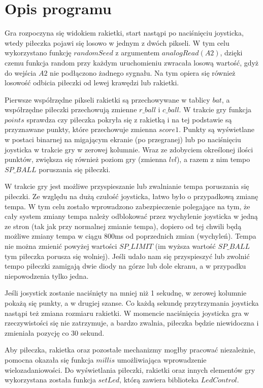\documentclass[12pt,notitlepage]{article}
\begin{document}
\section{Opis programu}

Gra rozpoczyna się widokiem rakietki, start nastąpi po naciśnięciu joysticka, wtedy piłeczka pojawi się losowo w jednym
z dwóch pikseli. W tym celu wykorzystano funkcję $randomSeed$ z argumentem $analogRead(A2)$, dzięki czemu funkcja random 
przy każdym uruchomieniu zwracała losową wartość, gdyż do wejścia $A2$ nie podłączono żadnego sygnału.
Na tym opiera się również losowość odbicia piłeczki od lewej krawędzi lub rakietki.

Pierwsze współrzędne pikseli rakietki są przechowywane w tablicy $bat$, a współrzędne piłeczki przechowują zmienne $r\_ball$ i $c\_ball$.
W trakcie gry funkcja $points$ sprawdza czy piłeczka pokryła się z rakietką i na tej podstawie są przyznawane punkty, które przechowuje zmienna $score1$.
Punkty są wyświetlane w postaci binarnej na migającym ekranie (po przegranej) lub po naciśnięciu joysticka w trakcie gry w zerowej kolumnie.
Wraz ze zdobyciem określonej ilości punktów, zwiększa się również poziom gry (zmienna $lvl$), a razem z nim tempo $SP\_BALL$ poruszania się piłeczki.

W trakcie gry jest możliwe przyspieszanie lub zwalnianie tempa poruszania się piłeczki. Ze względu na dużą czułość joysticka, łatwo było o
przypadkową zmianę tempa. W tym celu zostało wprowadzono zabezpieczenie polegające na tym, że cały system zmiany tempa należy odblokować
przez wychylenie joysticka w jedną ze stron (tak jak przy normalnej zmianie tempa), dopiero od tej chwili będą możliwe zmiany tempa w ciągu
800ms od poprzednich zmian (wychyleń).
Tempa nie można zmienić powyżej wartości $SP\_LIMIT$ (im wyższa wartość $SP\_BALL$ tym piłeczka porusza się wolniej).
Jeśli udało nam się przyspieszyć lub zwolnić tempo piłeczki zamigają dwie diody na górze lub dole ekranu, a w przypadku niepowodzenia tylko jedna.

Jeśli josystick zostanie naciśnięty na mniej niż 1 sekudnę, w zerowej kolumnie pokażą się punkty, a w drugiej szanse.
Co każdą sekundę przytrzymania joysticka nastąpi też zmiana rozmiaru rakietki. 
W momencie naciśnięcia joysticka gra w rzeczywistości się nie zatrzymuje, a bardzo zwalnia, piłeczka będzie niewidoczna i zmieniała pozycję co 30 sekund.

Aby piłeczka, rakietka oraz pozostałe mechanizmy mogłby pracować niezależnie, pomocna okazała się funkcja $millis$ umożliwiająca wprowadzenie wielozadaniowości.
Do wyświetlania piłeczki, rakietki oraz innych elementów gry wykorzystana została funkcja $setLed$, którą zawiera biblioteka $LedControl$.
\end{document}
